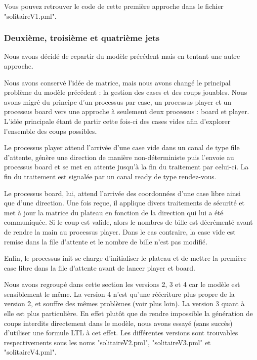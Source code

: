 \documentclass[12pt, a4paper]{report}
\begin{document}
Vous pouvez retrouver le code de cette première approche dans le fichier "solitaireV1.pml".

\subsubsection{Deuxième, troisième et quatrième jets}

Nous avons décidé de repartir du modèle précédent mais en tentant une autre approche.

Nous avons conservé l'idée de matrice, mais nous avons changé le principal problème du modèle précédent : la gestion des cases et des coups jouables. Nous avons migré du principe d'un processus par case, un processus player et un processus board vers une approche à seulement deux processus : board et player. L'idée principale étant de partir cette fois-ci des cases vides afin d'explorer l'ensemble des coups possibles.

Le processus player attend l'arrivée d'une case vide dans un canal de type file d'attente, génère une direction de manière non-déterministe puis l'envoie au processus board et se met en attente jusqu'à la fin du traitement par celui-ci. La fin du traitement est signalée par un canal ready de type rendez-vous.

Le processus board, lui, attend l'arrivée des coordonnées d'une case libre ainsi que d'une direction. Une fois reçue, il applique divers traitements de sécurité et met à jour la matrice du plateau en fonction de la direction qui lui a été communiquée. Si le coup est valide, alors le nombres de bille est décrémenté avant de rendre la main au processus player. Dans le cas contraire, la case vide est remise dans la file d'attente et le nombre de bille n'est pas modifié.

Enfin, le processus init se charge d'initialiser le plateau et de mettre la première case libre dans la file d'attente avant de lancer player et board.

Nous avons regroupé dans cette section les versions 2, 3 et 4 car le modèle est sensiblement le même. La version 4 n'est qu'une réécriture plus propre de la version 2, et souffre des mêmes problèmes (voir plus loin). La version 3 quant à elle est plus particulière. En effet plutôt que de rendre impossible la génération de coups interdits directement dans le modèle, nous avons essayé (sans succès) d'utiliser une formule LTL à cet effet.
Les différentes versions sont trouvables respectivements sous les noms "solitaireV2.pml", "solitaireV3.pml" et "solitaireV4.pml".
\end{document}
